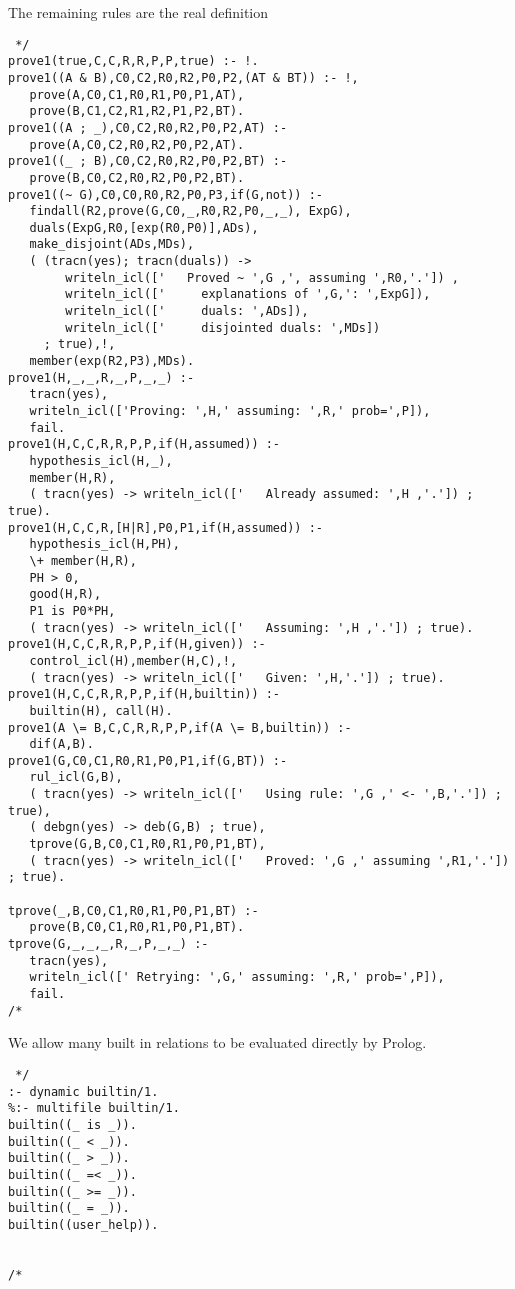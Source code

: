 \documentclass[11pt,fleqn]{article}
\begin{document}
The remaining rules are the real definition
\begin{verbatim} */
prove1(true,C,C,R,R,P,P,true) :- !.
prove1((A & B),C0,C2,R0,R2,P0,P2,(AT & BT)) :- !,
   prove(A,C0,C1,R0,R1,P0,P1,AT),
   prove(B,C1,C2,R1,R2,P1,P2,BT).
prove1((A ; _),C0,C2,R0,R2,P0,P2,AT) :-
   prove(A,C0,C2,R0,R2,P0,P2,AT).
prove1((_ ; B),C0,C2,R0,R2,P0,P2,BT) :-
   prove(B,C0,C2,R0,R2,P0,P2,BT).
prove1((~ G),C0,C0,R0,R2,P0,P3,if(G,not)) :-
   findall(R2,prove(G,C0,_,R0,R2,P0,_,_), ExpG),
   duals(ExpG,R0,[exp(R0,P0)],ADs),
   make_disjoint(ADs,MDs),
   ( (tracn(yes); tracn(duals)) -> 
        writeln_icl(['   Proved ~ ',G ,', assuming ',R0,'.']) ,
        writeln_icl(['     explanations of ',G,': ',ExpG]),
        writeln_icl(['     duals: ',ADs]),
        writeln_icl(['     disjointed duals: ',MDs])
     ; true),!,
   member(exp(R2,P3),MDs).
prove1(H,_,_,R,_,P,_,_) :-
   tracn(yes),
   writeln_icl(['Proving: ',H,' assuming: ',R,' prob=',P]),
   fail.
prove1(H,C,C,R,R,P,P,if(H,assumed)) :-
   hypothesis_icl(H,_),
   member(H,R),
   ( tracn(yes) -> writeln_icl(['   Already assumed: ',H ,'.']) ; true).
prove1(H,C,C,R,[H|R],P0,P1,if(H,assumed)) :-
   hypothesis_icl(H,PH),
   \+ member(H,R),
   PH > 0,
   good(H,R),
   P1 is P0*PH,
   ( tracn(yes) -> writeln_icl(['   Assuming: ',H ,'.']) ; true).
prove1(H,C,C,R,R,P,P,if(H,given)) :- 
   control_icl(H),member(H,C),!,
   ( tracn(yes) -> writeln_icl(['   Given: ',H,'.']) ; true).
prove1(H,C,C,R,R,P,P,if(H,builtin)) :- 
   builtin(H), call(H).
prove1(A \= B,C,C,R,R,P,P,if(A \= B,builtin)) :- 
   dif(A,B).
prove1(G,C0,C1,R0,R1,P0,P1,if(G,BT)) :-
   rul_icl(G,B),
   ( tracn(yes) -> writeln_icl(['   Using rule: ',G ,' <- ',B,'.']) ; true),
   ( debgn(yes) -> deb(G,B) ; true),
   tprove(G,B,C0,C1,R0,R1,P0,P1,BT),
   ( tracn(yes) -> writeln_icl(['   Proved: ',G ,' assuming ',R1,'.']) ; true).

tprove(_,B,C0,C1,R0,R1,P0,P1,BT) :-
   prove(B,C0,C1,R0,R1,P0,P1,BT).
tprove(G,_,_,_,R,_,P,_,_) :-
   tracn(yes),
   writeln_icl([' Retrying: ',G,' assuming: ',R,' prob=',P]),
   fail.
/* \end{verbatim}

We allow many built in relations to be evaluated directly by Prolog.
\begin{verbatim} */
:- dynamic builtin/1.
%:- multifile builtin/1.
builtin((_ is _)).
builtin((_ < _)).
builtin((_ > _)).
builtin((_ =< _)).
builtin((_ >= _)).
builtin((_ = _)).
builtin((user_help)).


/* \end{verbatim}
\end{document}
